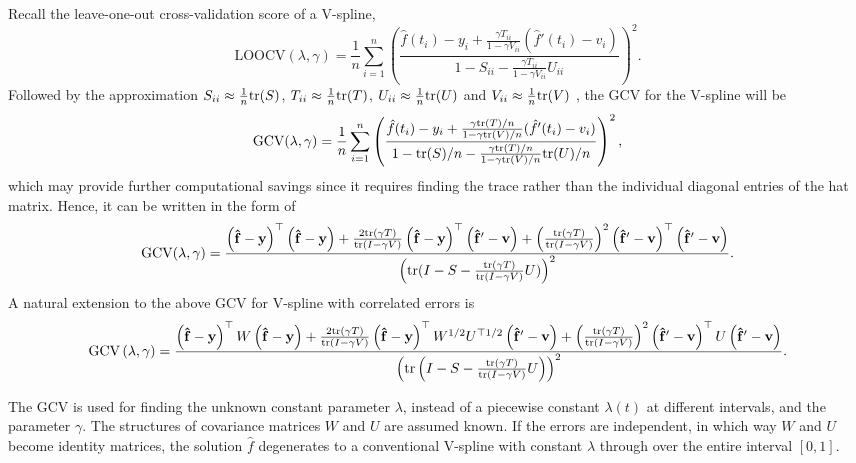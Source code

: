 Recall the leave-one-out cross-validation score of a V-spline, 
\begin{equation}
\mbox{LOOCV}(\lambda,\gamma)=\frac{1}{n}\sum_{i=1}^{n}\left( \frac{\hat{f}(t_i)-y_i+\frac{\gamma T_{ii}}{1-\gamma V_{ii}}(\hat{f}'(t_i)-v_i)}{1-S_{ii}-\frac{\gamma T_{ii}}{1-\gamma V_{ii}}U_{ii}} \right)^2.
\end{equation}
Followed by the approximation $S_{ii}\approx\frac{1}{n}\mathrm{tr}(S)$, $T_{ii}\approx\frac{1}{n}\mathrm{tr}(T)$, $U_{ii}\approx\frac{1}{n}\mathrm{tr}(U)$ and $V_{ii}\approx\frac{1}{n}\mathrm{tr}(V)$ \citep{syed2011review}, the GCV for the V-spline will be 
\begin{equation}
\mbox{GCV}(\lambda,\gamma)=\frac{1}{n}\sum_{i=1}^{n}\left( \frac{\hat{f}(t_i)-y_i+ \frac{\gamma\mathrm{tr}(T)/n}{1-\gamma \mathrm{tr}(V)/n}(\hat{f}'(t_i)-v_i)}{1-\mathrm{tr}(S)/n-\frac{\gamma\mathrm{tr}(T)/n}{1-\gamma \mathrm{tr}(V)/n} \mathrm{tr}(U)/n} \right)^2,
\end{equation}
which may provide further computational savings since it requires finding the trace rather than the individual diagonal entries of the hat matrix. Hence, it can be written in the form of \footnotesize
\begin{equation}
\mbox{GCV}(\lambda,\gamma)=\frac{\left(\mathbf{\hat{f}}-\mathbf{y}\right)^\top \left(\mathbf{\hat{f}}-\mathbf{y}\right) + \frac{2\mathrm{tr}\left(\gamma T\right)}{\mathrm{tr}\left(I-\gamma V\right)}\left(\mathbf{\hat{f}}-\mathbf{y}\right)^\top \left(\mathbf{\hat{f}}'-\mathbf{v}\right) + \left( \frac{\mathrm{tr}(\gamma T)}{\mathrm{tr}(I-\gamma V)} \right)^2 \left(\mathbf{\hat{f}}'-\mathbf{v}\right)^\top \left(\mathbf{\hat{f}}'-\mathbf{v}\right)}{\left( \mathrm{tr}(I-S-\frac{\mathrm{tr}(\gamma T)}{\mathrm{tr}(I-\gamma V)}U) \right)^2}.
\end{equation} \normalsize
A natural extension to the above GCV for V-spline with correlated errors is \scriptsize
\begin{equation}
\mbox{GCV}\left(\lambda,\gamma\right)=\frac{\left(\mathbf{\hat{f}}-\mathbf{y}\right)^\top W\left(\mathbf{\hat{f}}-\mathbf{y}\right)+\frac{2\mathrm{tr}\left(\gamma T\right)}{\mathrm{tr}\left(I-\gamma V\right)}\left(\mathbf{\hat{f}}-\mathbf{y}\right)^\top W^{1/2}U^{\top 1/2}\left(\mathbf{\hat{f}}'-\mathbf{v}\right) + \left( \frac{\mathrm{tr}\left(\gamma T\right)}{\mathrm{tr}\left(I-\gamma V\right)} \right)^2 \left(\mathbf{\hat{f}}'-\mathbf{v}\right)^\top U\left(\mathbf{\hat{f}}'-\mathbf{v}\right)}{\left( \mathrm{tr}\left(I-S-\frac{\mathrm{tr}\left(\gamma T\right)}{\mathrm{tr}\left(I-\gamma V\right)}U\right) \right)^2}.
\end{equation}
\normalsize


The GCV is used for finding the unknown constant parameter $\lambda$, instead of a piecewise constant $\lambda(t)$ at different intervals, and the parameter $\gamma$. The structures of covariance matrices $W$ and $U$ are assumed known. If the errors are independent, in which way $W$ and $U$ become identity matrices, the solution $\hat{f}$ degenerates to a conventional V-spline with constant $\lambda$ through over the entire interval $[0,1]$.  



